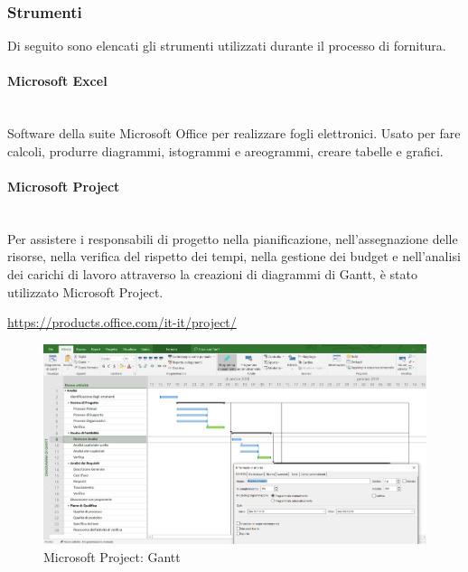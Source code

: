 		

		
	\subsubsection{Strumenti}
	Di seguito sono elencati gli strumenti utilizzati durante il processo di 
	fornitura.
	
		\paragraph{Microsoft Excel} \mbox{}\\ 
		
		\noindent Software della suite Microsoft Office per realizzare fogli elettronici. Usato 
		per fare calcoli, produrre diagrammi, istogrammi e areogrammi, creare tabelle e 
		grafici.
				
		\paragraph{Microsoft Project} \mbox{}\\ 
		
		\noindent Per assistere i responsabili di progetto nella pianificazione, 
		nell'assegnazione delle risorse, nella verifica del rispetto dei tempi, nella 
		gestione dei budget e nell'analisi dei carichi di lavoro attraverso la creazioni 
		di diagrammi di Gantt\glo, è stato utilizzato Microsoft Project. \\
				\centerline{\url{https://products.office.com/it-it/project/}}
			\begin{figure}[H]
				\includegraphics[width=0.99\linewidth]{res/images/projectS.png}
				\caption{Microsoft Project: Gantt}
			\end{figure}
			 

		
		
